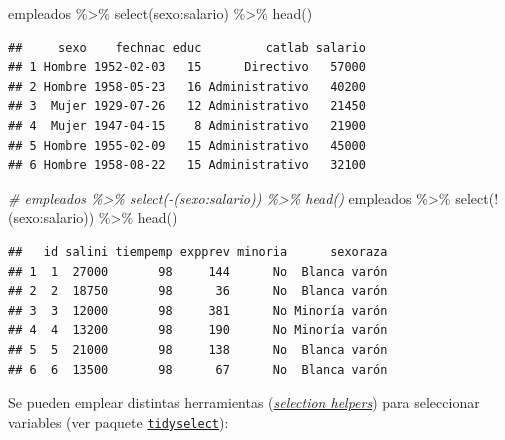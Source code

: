 \documentclass[
]{book}
\newenvironment{Shaded}{\begin{snugshade}}{\end{snugshade}}
\newcommand{\CommentTok}[1]{\textcolor[rgb]{0.56,0.35,0.01}{\textit{#1}}}
\newcommand{\FunctionTok}[1]{\textcolor[rgb]{0.00,0.00,0.00}{#1}}
\newcommand{\NormalTok}[1]{#1}
\newcommand{\SpecialCharTok}[1]{\textcolor[rgb]{0.00,0.00,0.00}{#1}}
\theoremstyle{break}
\theoremstyle{nonumberplain}
\begin{document}
\begin{Shaded}
\begin{Highlighting}[]
\NormalTok{empleados }\SpecialCharTok{\%\textgreater{}\%} \FunctionTok{select}\NormalTok{(sexo}\SpecialCharTok{:}\NormalTok{salario) }\SpecialCharTok{\%\textgreater{}\%} \FunctionTok{head}\NormalTok{()}
\end{Highlighting}
\end{Shaded}

\begin{verbatim}
##     sexo    fechnac educ         catlab salario
## 1 Hombre 1952-02-03   15      Directivo   57000
## 2 Hombre 1958-05-23   16 Administrativo   40200
## 3  Mujer 1929-07-26   12 Administrativo   21450
## 4  Mujer 1947-04-15    8 Administrativo   21900
## 5 Hombre 1955-02-09   15 Administrativo   45000
## 6 Hombre 1958-08-22   15 Administrativo   32100
\end{verbatim}

\begin{Shaded}
\begin{Highlighting}[]
\CommentTok{\# empleados \%\textgreater{}\% select({-}(sexo:salario)) \%\textgreater{}\% head()}
\NormalTok{empleados }\SpecialCharTok{\%\textgreater{}\%} \FunctionTok{select}\NormalTok{(}\SpecialCharTok{!}\NormalTok{(sexo}\SpecialCharTok{:}\NormalTok{salario)) }\SpecialCharTok{\%\textgreater{}\%} \FunctionTok{head}\NormalTok{()}
\end{Highlighting}
\end{Shaded}

\begin{verbatim}
##   id salini tiempemp expprev minoria      sexoraza
## 1  1  27000       98     144      No  Blanca varón
## 2  2  18750       98      36      No  Blanca varón
## 3  3  12000       98     381      No Minoría varón
## 4  4  13200       98     190      No Minoría varón
## 5  5  21000       98     138      No  Blanca varón
## 6  6  13500       98      67      No  Blanca varón
\end{verbatim}

Se pueden emplear distintas herramientas (\emph{\href{https://tidyselect.r-lib.org/reference/language.html}{selection helpers}}) para seleccionar variables (ver paquete \href{https://tidyselect.r-lib.org}{\texttt{tidyselect}}):
\end{document}
